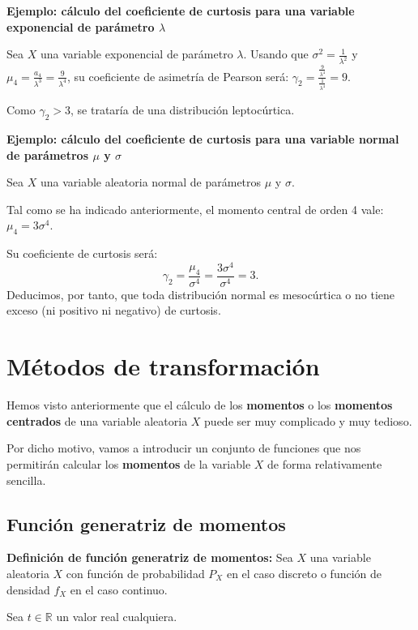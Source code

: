 \documentclass[
  letterpaper,
  DIV=11,
  numbers=noendperiod]{scrreprt}
\begin{document}
\textbf{Ejemplo: cálculo del coeficiente de curtosis para una variable
exponencial de parámetro \(\lambda\)}

Sea \(X\) una variable exponencial de parámetro \(\lambda\). Usando que
\(\sigma^2=\frac{1}{\lambda^2}\) y
\(\mu_4 =\frac{a_4}{\lambda^3}=\frac{9}{\lambda^4}\), su coeficiente de
asimetría de Pearson será:
\(\gamma_2 = \frac{\frac{9}{\lambda^4}}{\frac{1}{\lambda^4}}=9.\)

Como \(\gamma_2 >3\), se trataría de una distribución leptocúrtica.

\textbf{Ejemplo: cálculo del coeficiente de curtosis para una variable
normal de parámetros \(\mu\) y \(\sigma\)}

Sea \(X\) una variable aleatoria normal de parámetros \(\mu\) y
\(\sigma\).

Tal como se ha indicado anteriormente, el momento central de orden 4
vale: \(\mu_4 = 3\sigma^4\).

Su coeficiente de curtosis será: \[
\gamma_2 =\frac{\mu_4}{\sigma^4}=\frac{3\sigma^4}{\sigma^4}=3.
\] Deducimos, por tanto, que toda distribución normal es mesocúrtica o
no tiene exceso (ni positivo ni negativo) de curtosis.

\hypertarget{muxe9todos-de-transformaciuxf3n}{%
\section{Métodos de
transformación}\label{muxe9todos-de-transformaciuxf3n}}

Hemos visto anteriormente que el cálculo de los \textbf{momentos} o los
\textbf{momentos centrados} de una variable aleatoria \(X\) puede ser
muy complicado y muy tedioso.

Por dicho motivo, vamos a introducir un conjunto de funciones que nos
permitirán calcular los \textbf{momentos} de la variable \(X\) de forma
relativamente sencilla.

\hypertarget{funciuxf3n-generatriz-de-momentos}{%
\subsection{Función generatriz de
momentos}\label{funciuxf3n-generatriz-de-momentos}}

\textbf{Definición de función generatriz de momentos:} Sea \(X\) una
variable aleatoria \(X\) con función de probabilidad \(P_X\) en el caso
discreto o función de densidad \(f_X\) en el caso continuo.

Sea \(t\in\mathbb{R}\) un valor real cualquiera.
\end{document}
